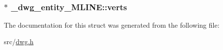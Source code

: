 \hypertarget{struct__dwg__entity__MLINE_a7b98ac771f590ff09085ca0f2ac81152}{
\subsubsection[{verts}]{$\ast$ {\bf \-\_\-dwg\-\_\-entity\-\_\-\-M\-L\-I\-N\-E\-::verts}}}\label{struct__dwg__entity__MLINE_a7b98ac771f590ff09085ca0f2ac81152}


\-The documentation for this struct was generated from the following file\-:\begin{DoxyCompactItemize}
\item 
src/\hyperlink{dwg_8h}{dwg.\-h}\end{DoxyCompactItemize}
